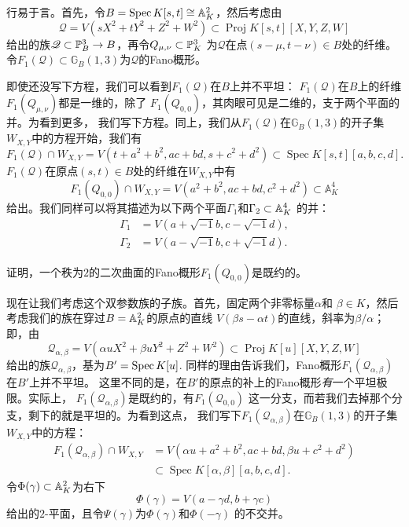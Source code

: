 
行易于言。首先，令$B=\spec K[s,t]\cong \A_K^2$，然后考虑由
\[
	\mathscr{Q}=V\left(s X^{2}+t Y^{2}+Z^{2}+W^{2}\right) \subset \operatorname{Proj} K[s, t][X, Y, Z, W]
\]
给出的族$\mathscr Q\subset \P_B^3\to B$，再令$Q_{\mu,\nu}\subset \P_K^3$
为$\mathscr Q$在点$(s-\mu,t-\nu)\in B$处的纤维。令$F_1(\mathscr Q)\subset 
\mathbb G_B(1,3)$为$\mathscr Q$的Fano概形。

即使还没写下方程，我们可以看到$F_1(\mathscr Q)$在$B$上并不平坦：
$F_1(\mathscr Q)$在$B$上的纤维$F_1(Q_{\mu,\nu})$都是一维的，除了
$F_1(Q_{0,0})$，其肉眼可见是二维的，支于两个平面的并。为看到更多，
我们写下方程。同上，我们从$F_1(\mathscr Q)$在$\mathbb G_B(1,3)$的开子集
$W_{X,Y}$中的方程开始，我们有
\[
	F_{1}(\mathscr{Q}) \cap W_{X, Y}=V\left(t+a^{2}+b^{2}, a c+b d, s+c^{2}+d^{2}\right) \subset \operatorname{Spec} K[s, t][a, b, c, d].
\]
$F_1(\mathscr Q)$在原点$(s,t)\in B$处的纤维在$W_{X,Y}$中有
\[
	F_{1}\left(Q_{0,0}\right) \cap W_{X, Y}=V\left(a^{2}+b^{2}, a c+b d, c^{2}+d^{2}\right) \subset \mathbb{A}_{K}^{4}
\]
给出。我们同样可以将其描述为以下两个平面$\Gamma_1$和$\Gamma_2\subset \A_K^4$
的并：
\begin{align*}
	\Gamma_{1}&=V(a+\sqrt{-1} b, c-\sqrt{-1} d),\\
	\Gamma_{2}&=V(a-\sqrt{-1} b, c+\sqrt{-1} d).
\end{align*}

\begin{exe}\label{exe:6.68}
	证明，一个秩为$2$的二次曲面的Fano概形$F_1(Q_{0,0})$是既约的。
\end{exe}

现在让我们考虑这个双参数族的子族。首先，固定两个非零标量$\alpha$和
$\beta\in K$，然后考虑我们的族在穿过$B=\A_K^2$的原点的直线
$V(\beta s-\alpha t)$的直线，斜率为$\beta/\alpha$；即，由
\[
	\mathscr{Q}_{\alpha, \beta}=V\left(\alpha u X^{2}+\beta u Y^{2}+Z^{2}+W^{2}\right) \subset \operatorname{Proj} K[u][X, Y, Z, W]
\]
给出的族$\mathscr Q_{\alpha,\beta}$，基为$B'=\spec K[u]$.
同样的理由告诉我们，Fano概形$F_1(\mathscr Q_{\alpha,\beta})$在$B'$上并不平坦。
这里不同的是，在$B'$的原点的补上的Fano概形\emph{有}一个平坦极限。实际上，
$F_1(\mathscr Q_{\alpha,\beta})$是既约的，有$F_1(\mathscr Q_{0,0})$
这一分支，而若我们去掉那个分支，剩下的就是平坦的。为看到这点，
我们写下$F_1(\mathscr Q_{\alpha,\beta})$在$\mathbb G_B(1,3)$的开子集
$W_{X,Y}$中的方程：
\[
\begin{aligned} F_{1}\left(\mathscr{Q}_{\alpha, \beta}\right) \cap W_{X, Y} &=V\left(\alpha u+a^{2}+b^{2}, a c+b d, \beta u+c^{2}+d^{2}\right) \\ & \subset \operatorname{Spec} K[\alpha, \beta][a, b, c, d]. \end{aligned}
\]
令$\Phi(\gamma)\subset \A_K^2$为右下
\[
	\Phi(\gamma)=V(a-\gamma d, b+\gamma c)
\]
给出的$2$-平面，且令$\Psi(\gamma)$为$\Phi(\gamma)$和$\Phi(-\gamma)$
的不交并。

